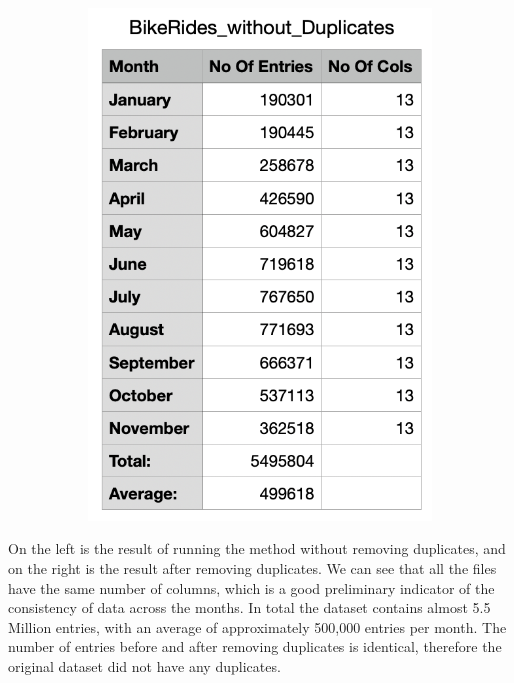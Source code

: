 \documentclass[12pt]{article}
\begin{document}
\begin{itemize}
\begin{figure}[h]
\begin{subfigure}{.4\textwidth}
		\includegraphics[scale=0.5]{img3.png}
	\end{subfigure}
	\end{figure}
	\pagebreak
	
On the left is the result of running the method without removing duplicates, and on the right is the result after removing duplicates. We can see that all the files have the same number of columns, which is a good preliminary indicator of the consistency of data across the months. In total the dataset contains almost 5.5 Million entries, with an average of approximately 500,000 entries per month. The number of entries before and after removing duplicates is identical, therefore the original dataset did not have any duplicates. \\


\end{itemize}
\end{document}
